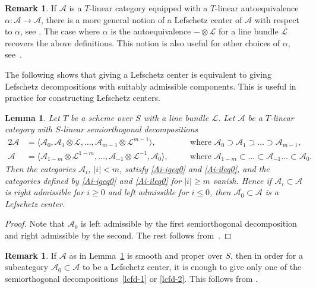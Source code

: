 \documentclass[11pt, reqno]{amsart}
\numberwithin{equation}{section}
\theoremstyle{plain}
\newtheorem{lemma}[theorem]{Lemma}
\theoremstyle{definition}
\newtheorem{remark}[theorem]{Remark}
\newcommand{\cA}{\mathcal{A}}
\newcommand{\cL}{\mathcal{L}}
\begin{document}
\begin{remark}
\label{remark-alpha-ld}
If $\cA$ is a $T$-linear category equipped with a $T$-linear 
autoequivalence $\alpha \colon \cA \to \cA$, there is a more general notion of 
a Lefschetz center of $\cA$ with respect to $\alpha$, see \cite[\S6.1]{NCHPD}. 
The case where $\alpha$ is the autoequivalence $- \otimes \cL$ for a line bundle $\cL$ 
recovers the above definitions. 
This notion is also useful for other choices of $\alpha$, see~\cite[\S2]{kuznetsov2018residual}.
\end{remark}

The following shows that giving a Lefschetz center is equivalent to giving 
Lefschetz decompositions with suitably admissible components. 
This is useful in practice for constructing Lefschetz centers.

\begin{lemma}
\label{lemma-lef-center-from-decomp}
Let $T$ be a scheme over $S$ with a line bundle $\cL$. 
Let $\cA$ be a $T$-linear category with $S$-linear semiorthogonal decompositions 
\begin{alignat}{2}
\label{lcfd-1} \cA & = \langle \cA_0, \cA_1 \otimes \cL, \dots, \cA_{m-1} \otimes \cL^{m-1} \rangle, 
 &  &  \text{where }   {\cA_0 \supset \cA_1 \supset \dots \supset \cA_{m-1}} , \\ 
\label{lcfd-2}  \cA & = \langle \cA_{1-m} \otimes \cL^{1-m}, \dots, \cA_{-1} \otimes \cL^{-1}, \cA_0 \rangle,
  \quad & & \text{where } {\cA_{1-m} \subset \dots \subset \cA_{-1} \dots \subset \cA_0}.
\end{alignat} 
Then the categories $\cA_i$, $|i| < m$, satisfy \eqref{Ai-igeq0} and \eqref{Ai-ileq0}, and 
the categories defined by \eqref{Ai-igeq0} and \eqref{Ai-ileq0} for $|i| \geq m$ vanish. 
Hence if $\cA_i \subset \cA$ is right admissible for $i \geq 0$ and left admissible for $i \leq 0$, 
then $\cA_0 \subset \cA$ is a Lefschetz center. 
\end{lemma}

\begin{proof}
Note that $\cA_0$ is left admissible by the first semiorthogonal decomposition and right admissible by the second.
The rest follows from~\cite[Lemma 6.3]{NCHPD}. 
\end{proof}

\begin{remark}
\label{remark:lc-sp}
If $\cA$ as in Lemma~\ref{lemma-lef-center-from-decomp} is smooth and proper over $S$, 
then in order for a subcategory $\cA_0 \subset \cA$ to be a Lefschetz center, 
it is enough to give only one of the semiorthogonal decompositions~\eqref{lcfd-1} or \eqref{lcfd-2}. 
This follows from \cite[Lemmas 4.15 and 6.3]{NCHPD}.
\end{remark}
\end{document}
